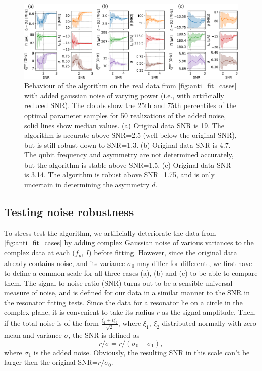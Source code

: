 \documentclass[%
 aip,
 draft,
 amsmath,amssymb,
 reprint,%
]{revtex4-1}
\begin{document}
\begin{figure}
	\centering
	\includegraphics[width=\linewidth]{noise_test}
	\caption{Behaviour of the algorithm on the real data from \autoref{fig:anti_fit_cases} with added gaussian noise of varying power (i.e., with artificially reduced SNR). The clouds show the 25th and 75th percentiles of the optimal parameter samples for 50 realizations of the added noise, solid lines show median values. (a) Original data SNR is 19. The algorithm is accurate above SNR=2.5 (well below the original SNR), but is still robust down to SNR=1.3. (b) Original data SNR is 4.7. The qubit frequency and asymmetry are not determined accurately, but the algorithm is stable above SNR=1.5. (c) Original data SNR is 3.14. The algorithm is robust above SNR=1.75, and is only uncertain in determining the asymmetry $d$.}
	\label{fig:noise_test}
\end{figure}

\subsection{Testing noise robustness}

To stress test the algorithm, we artificially deteriorate the data from \autoref{fig:anti_fit_cases} by adding complex Gaussian noise of various variances to the complex data at each ($f_p$, $I$) before fitting. However, since the original data already contains noise, and its variance $\sigma_0$ may differ for different , we first have to define a common scale for all three cases (a), (b) and (c) to be able to compare them. The signal-to-noise ratio (SNR) turns out to be a sensible universal measure of noise, and is defined for our data in a similar manner to the SNR in the resonator fitting tests\cite{probst2015}. Since the data for a resonator lie on a circle in the complex plane, it is convenient to take its radius $r$ as the signal amplitude. Then, if the total noise is of the form $\frac{\xi_1+i\xi_2}{\sqrt 2}$, where $\xi_1,\ \xi_2$ distributed normally with zero mean and variance $\sigma$, the SNR is defined as 
\begin{equation}
r/\sigma = r/(\sigma_0+\sigma_1),
\label{eq:SNR}
\end{equation}
where $\sigma_1$ is the added noise. Obviously, the resulting SNR in this scale can't be larger then the original SNR=$r/\sigma_0$. 
\end{document}
